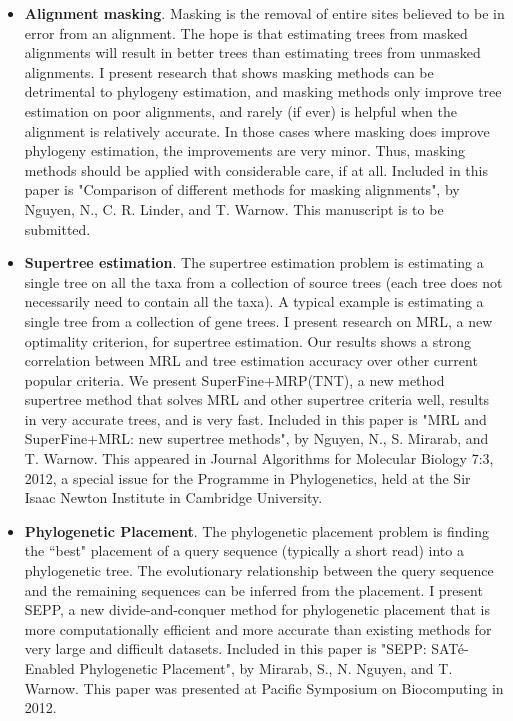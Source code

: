 \documentclass[times, 10pt]{article}
\begin{document}
\begin{itemize}
\item \textbf{Alignment masking}. Masking is the removal of entire sites believed to be in error from an alignment.  The hope is that estimating trees from masked alignments will result in better trees than estimating trees from unmasked alignments.  I present research that shows masking methods can be detrimental to phylogeny estimation, and masking methods only improve tree estimation on poor alignments, and rarely (if ever) is helpful when the alignment is relatively accurate.  In those cases where masking does improve phylogeny estimation, the improvements are very minor.  Thus, masking methods should be applied with considerable care, if at all.  Included in this paper is "Comparison of different methods for masking alignments", by Nguyen, N., C. R. Linder, and T. Warnow. This manuscript is to be submitted.
\item \textbf{Supertree estimation}.  The supertree estimation problem is estimating a single tree on all the taxa from a collection of source trees (each tree does not necessarily need to contain all the taxa).  A typical example is estimating a single tree from a collection of gene trees.  I present research on MRL, a new optimality criterion, for supertree estimation.  Our results shows a strong correlation between MRL and tree estimation accuracy over other current popular criteria.  We present SuperFine+MRP(TNT), a new method supertree method that solves MRL and other supertree criteria well, results in very accurate trees, and is very fast.  Included in this paper is "MRL and SuperFine+MRL: new supertree methods", by Nguyen, N., S. Mirarab, and T. Warnow. This appeared in Journal Algorithms for Molecular Biology 7:3, 2012, a special issue for the Programme in Phylogenetics, held at the Sir Isaac Newton Institute in Cambridge University.
\item \textbf{Phylogenetic Placement}.  The phylogenetic placement problem is finding the ``best" placement of a query sequence (typically a short read) into a phylogenetic tree.  The evolutionary relationship between the query sequence and the remaining sequences can be inferred from the placement.  I present SEPP, a new divide-and-conquer method for phylogenetic placement that is more computationally efficient and more accurate than existing methods for very large and difficult datasets.  Included in this paper is "SEPP: SAT\'{e}-Enabled Phylogenetic Placement", by Mirarab, S., N. Nguyen, and T. Warnow. This paper was presented at Pacific Symposium on Biocomputing in 2012.

\end{itemize}
\end{document}
